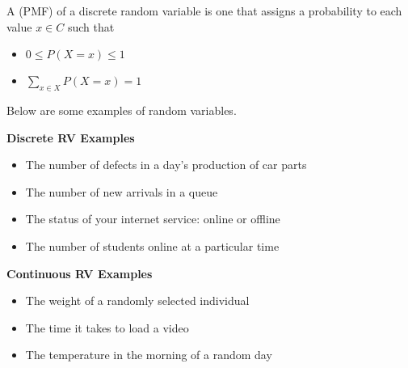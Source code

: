 \begin{definition}
    A  (PMF) of a discrete random variable is one that assigns a probability to each value $x \in C$ such that 
    \begin{itemize}
        \item $0 \le P(X = x) \le 1$
        \item $\sum_{x \in X} P(X = x) = 1$
    \end{itemize}
\end{definition}

\begin{example} 
    Below are some examples of random variables. 

    \textbf{Discrete RV Examples}
    
    \begin{itemize}
        \item The number of defects in a day's production of car parts 
        \item The number of new arrivals in a queue 
        \item The status of your internet service: online or offline 
        \item The number of students online at a particular time
    \end{itemize}

    \textbf{Continuous RV Examples}

    \begin{itemize}
        \item The weight of a randomly selected individual 
        \item The time it takes to load a video 
        \item The temperature in the morning of a random day
    \end{itemize}
\end{example}

